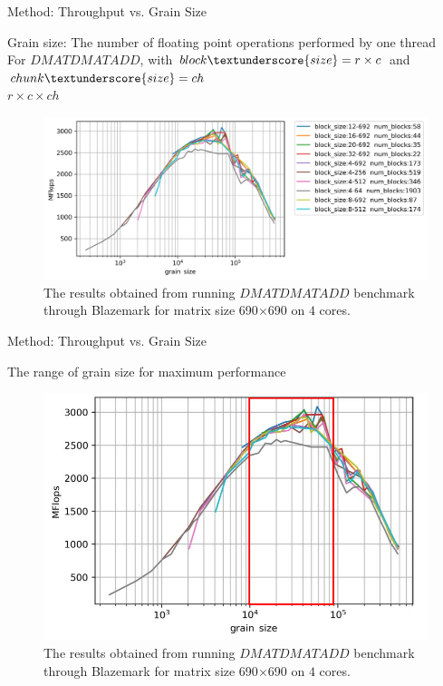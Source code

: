 \documentclass[10pt]{beamer}
\begin{document}
\begin{frame}{Method: Throughput vs. Grain Size}
	\begin{outline}
		Grain size: The number of floating point operations performed by one thread\\
		For $DMATDMATADD$, with $block\textunderscore{size}=r\times{c}$ and  $chunk\textunderscore{size}=ch$ \\ $r\times{c}\times{ch}$
		\begin{figure}[H]
			\centering\includegraphics[width=1\linewidth]{images/fig6.png}
			\caption{The results obtained from running $DMATDMATADD$ benchmark through Blazemark for matrix size 690$\times$690 on $4$ cores.}	
			\label{fig6}
		\end{figure}
	
	\end{outline}
\end{frame}

\begin{frame}{Method: Throughput vs. Grain Size}
	\begin{outline}		
		The range of grain size for maximum performance
		\begin{figure}[H]
			\centering\includegraphics[scale=0.9]{images/fig6_range.png}
			\caption{The results obtained from running $DMATDMATADD$ benchmark through Blazemark for matrix size 690$\times$690 on $4$ cores.}	
			\label{fig7}
		\end{figure}
		
	\end{outline}
\end{frame}
\end{document}

